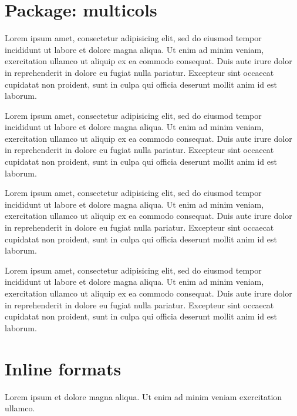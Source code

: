 \documentclass{article}
\begin{document}
\section{Package: multicols}

\begin{multicols}{2}
Lorem ipsum  amet, consectetur adipisicing elit, sed
do eiusmod tempor incididunt ut labore et dolore magna aliqua. Ut enim
ad minim veniam,  exercitation ullamco
 ut aliquip ex ea commodo consequat. Duis aute
irure dolor in reprehenderit in 
dolore eu fugiat nulla pariatur. Excepteur sint occaecat cupidatat non
proident, sunt in culpa qui officia deserunt mollit anim id est laborum.

Lorem ipsum  amet, consectetur adipisicing elit, sed
do eiusmod tempor incididunt ut labore et dolore magna aliqua. Ut enim
ad minim veniam,  exercitation ullamco
 ut aliquip ex ea commodo consequat. Duis aute
irure dolor in reprehenderit in 
dolore eu fugiat nulla pariatur. Excepteur sint occaecat cupidatat non
proident, sunt in culpa qui officia deserunt mollit anim id est laborum.

Lorem ipsum  amet, consectetur adipisicing elit, sed
do eiusmod tempor incididunt ut labore et dolore magna aliqua. Ut enim
ad minim veniam,  exercitation ullamco
 ut aliquip ex ea commodo consequat. Duis aute
irure dolor in reprehenderit in 
dolore eu fugiat nulla pariatur. Excepteur sint occaecat cupidatat non
proident, sunt in culpa qui officia deserunt mollit anim id est laborum.

Lorem ipsum  amet, consectetur adipisicing elit, sed
do eiusmod tempor incididunt ut labore et dolore magna aliqua. Ut enim
ad minim veniam,  exercitation ullamco
 ut aliquip ex ea commodo consequat. Duis aute
irure dolor in reprehenderit in 
dolore eu fugiat nulla pariatur. Excepteur sint occaecat cupidatat non
proident, sunt in culpa qui officia deserunt mollit anim id est laborum.
\end{multicols}

\section{Inline formats}

Lorem ipsum  et
dolore magna aliqua. Ut enim ad minim veniam exercitation ullamco.
\end{document}
